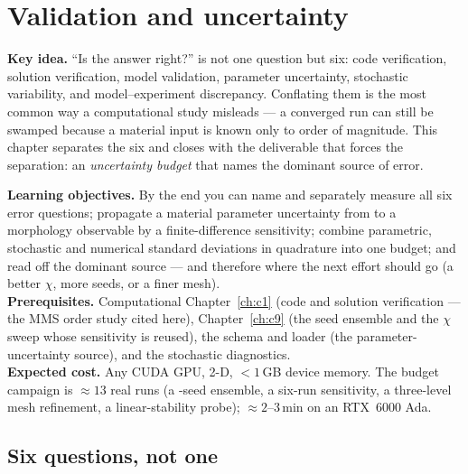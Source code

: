 \chapter{Validation and uncertainty}
\label{ch:c10}
\begin{keybox}
\textbf{Key idea.} ``Is the answer right?'' is not one question but six:
code verification, solution verification, model validation, parameter
uncertainty, stochastic variability, and model--experiment discrepancy.
Conflating them is the most common way a computational study misleads ---
a converged run can still be swamped because a material input is known
only to order of magnitude. This chapter separates the six and closes
with the deliverable that forces the separation: an \emph{uncertainty
budget} that names the dominant source of error.
\end{keybox}

\begin{keybox}
\textbf{Learning objectives.} By the end you can name and separately
measure all six error questions; propagate a material parameter
uncertainty from  to a morphology observable by a
finite-difference sensitivity; combine parametric, stochastic and
numerical standard deviations in quadrature into one budget; and read off
the dominant source --- and therefore where the next effort should go (a
better $\chi$, more seeds, or a finer mesh).\\[2pt]
\textbf{Prerequisites.} Computational Chapter~\ref{ch:c1} (code and
solution verification --- the MMS order study cited here),
Chapter~\ref{ch:c9} (the seed ensemble and the $\chi$ sweep whose
sensitivity is reused), the  schema and loader (the
parameter-uncertainty source), and the stochastic diagnostics.\\[2pt]
\textbf{Expected cost.} Any CUDA GPU, 2-D, $<1$\,GB device memory. The
budget campaign is $\approx13$ real runs (a \CtenNseeds-seed ensemble, a
six-run sensitivity, a three-level mesh refinement, a linear-stability
probe); $\approx2$--$3$\,min on an RTX~6000 Ada.
\end{keybox}

\section{Six questions, not one}

